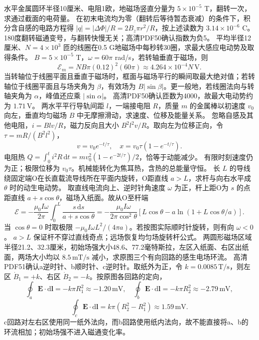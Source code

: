 \problemtext 水平金属圆环半径10厘米、电阻1欧，地磁场竖直分量为 $5\times10^{-5}$ T，翻转一次，求通过截面的电荷量。
\workings 在初末电流均为零（翻转后等待暂态衰减）的条件下，积分含自感的电路方程得 $|q|=|\Delta\Phi|/R=2B_z\pi r^2/R$，按上述读数为 $3.14\times10^{-6}$ C。
\crosscheck 180度翻转磁通变号，与翻转快慢无关；高清PDF50确认指数为负5。
\problemtext 平均半径12厘米、$N=4\times10^3$ 匝的线圈在0.5 G地磁场中每秒转30圈，求最大感应电动势及取得条件。
\workings $B=5\times10^{-5}$ T，$\omega=60\pi$ rad/s，若转轴垂直于磁场，则
\[
\mathcal E_m=NB\pi(0.12)^2(60\pi)\approx4.264\times10^{-4}N\,\mathrm V .
\]
当转轴位于线圈平面且垂直于磁场时，框面与磁场平行的瞬间取最大绝对值；若转轴位于线圈平面且与场夹角为 $\beta$，有效场为 $B|\sin\beta|$。更一般地，若线圈法向与转轴夹角为 $\alpha$，峰值还应乘 $|\sin\alpha|$。
\crosscheck 高清PDF50确认匝数为4000，故最大电动势约为 $1.71\,\mathrm V$。
\problemtext 两水平平行导轨间距 $l$，一端接电阻 $R$，质量 $m$ 的金属棒以初速度 $v_0$ 向左，垂直均匀磁场 $B$ 中无摩擦滑动，求速度、位移及能量关系。
\workings 忽略自感及其他电阻，$i=Blv/R$，磁力反向且大小 $B^2l^2v/R$。取向左为位移正向，令 $\tau=mR/(B^2l^2)$，
\[
v=v_0e^{-t/\tau},\quad x=v_0\tau(1-e^{-t/\tau}).
\]
电阻热 $Q=\int_0^t i^2R\,\mathrm dt=mv_0^2(1-e^{-2t/\tau})/2$，恰等于动能减少。
\crosscheck 有限时刻速度仍为正；极限位移为 $v_0\tau$。机械能转化为焦耳热，含热的总能量守恒。
\problemtext 长 $L$ 的导线绕固定端O在长直载流导线所在平面内旋转，O距直线 $a>L$，求杆与向右水平成 $\theta$ 时的动生电动势。
\workings 取直线电流向上、逆时针角速度 $\omega$ 为正，杆上距O为 $s$ 的点距直线 $a+s\cos\theta$，磁场入纸面。故从O至杆端
\[
\mathcal E=-\frac{\mu_0 I\omega}{2\pi}\int_0^L\frac{s\,\mathrm ds}{a+s\cos\theta}
=-\frac{\mu_0 I\omega}{2\pi\cos^2\theta}
\left[L\cos\theta-a\ln(1+L\cos\theta/a)\right].
\]
当 $\cos\theta=0$ 时取极限 $-\mu_0 I\omega L^2/(4\pi a)$。若按图实际顺时针旋转，则有向 $\omega<0$。
\crosscheck $a>L$ 保证杆不穿过直线奇点；远场恢复均匀场旋转杆公式。
\problemtext 两圆形磁场区域半径21.2、32.3厘米，初始场强大小48.6、77.2毫特斯拉，左区入纸面、右区出纸面，两场大小均以 $8.5\,\mathrm{mT/s}$ 减小，求原图三个有向回路的感生电场环流。
\workings 高清PDF51确认a逆时针、b顺时针、c逆时针。取纸外为正，令 $k=0.0085\,\mathrm{T/s}$，则左区 $\dot B_1=+k$、右区 $\dot B_2=-k$。按原图各回路的定向，
\[
\oint_a\bm E\cdot\mathrm d\bm l=-k\pi R_1^2\approx-1.20\,\mathrm{mV},\quad
\oint_b\bm E\cdot\mathrm d\bm l=-k\pi R_2^2\approx-2.79\,\mathrm{mV},
\]
\[
\oint_c\bm E\cdot\mathrm d\bm l=k\pi(R_2^2-R_1^2)\approx1.59\,\mathrm{mV}.
\]
\crosscheck c回路对左右区使用同一纸外法向，而b回路使用纸内法向，故不能直接将a、b的环流相加；初始场强不进入磁通变化率。

